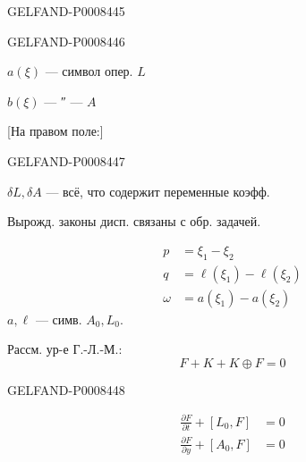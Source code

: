\begin{GelfandAdjacentEvidence}{GELFAND-P000844}{5}

\end{GelfandAdjacentEvidence}
\begin{GelfandAdjacentEvidence}{GELFAND-P000844}{6}


\(a(\xi)\) — символ опер. \(L\)

\(b(\xi)\) — ″ — \(A\)

[На правом поле:]
\end{GelfandAdjacentEvidence}
\begin{GelfandAdjacentEvidence}{GELFAND-P000844}{7}

\(\delta L,\delta A\) — всё, что содержит переменные коэфф.

Вырожд. законы дисп. связаны с обр. задачей.

\[
\begin{aligned}
p&=\xi_1-\xi_2\\
q&=\ell(\xi_1)-\ell(\xi_2)\\
\omega&=a(\xi_1)-a(\xi_2)
\end{aligned}
\]
\(a,\ell\) — симв. \(A_0,L_0\).

Рассм. ур-е Г.-Л.-М.:
\[
F+K+K\oplus F=0
\]
\end{GelfandAdjacentEvidence}
\begin{GelfandAdjacentEvidence}{GELFAND-P000844}{8}


\[
\begin{aligned}
\frac{\partial F}{\partial t}+[L_0,F]&=0\\
\frac{\partial F}{\partial y}+[A_0,F]&=0
\end{aligned}
\]
\end{GelfandAdjacentEvidence}
